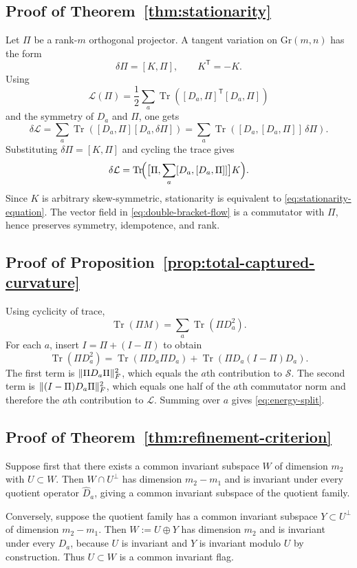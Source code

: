\documentclass[11pt,a4paper]{article}
\numberwithin{equation}{section}
\DeclareMathOperator{\Tr}{Tr}
\DeclarePairedDelimiter{\norm}{\lVert}{\rVert}
\newcommand{\Gr}{\mathrm{Gr}}
\theoremstyle{thmcompact}
\theoremstyle{remark}
\begin{document}
\subsection*{Proof of Theorem~\ref{thm:stationarity}}
Let $\Pi$ be a rank-$m$ orthogonal projector. A tangent variation on $\Gr(m,n)$ has the form
\[
\delta\Pi=[K,\Pi],\qquad K^{\mathsf T}=-K.
\]
Using
\[
\mathcal L(\Pi)=\frac12\sum_a\Tr([D_a,\Pi]^{\mathsf T}[D_a,\Pi])
\]
and the symmetry of $D_a$ and $\Pi$, one gets
\[
\delta\mathcal L=\sum_a\Tr([D_a,\Pi][D_a,\delta\Pi])=
\sum_a\Tr([D_a,[D_a,\Pi]]\,\delta\Pi).
\]
Substituting $\delta\Pi=[K,\Pi]$ and cycling the trace gives
\[
\delta\mathcal L=\Tr\!\Bigl(\bigl[\Pi,\sum_a[D_a,[D_a,\Pi]]\bigr]K\Bigr).
\]
Since $K$ is arbitrary skew-symmetric, stationarity is equivalent to \eqref{eq:stationarity-equation}. The vector field in \eqref{eq:double-bracket-flow} is a commutator with $\Pi$, hence preserves symmetry, idempotence, and rank.

\subsection*{Proof of Proposition~\ref{prop:total-captured-curvature}}
Using cyclicity of trace,
\[
\Tr(\Pi M)=\sum_a\Tr(\Pi D_a^2).
\]
For each $a$, insert $I=\Pi+(I-\Pi)$ to obtain
\[
\Tr(\Pi D_a^2)=\Tr(\Pi D_a\Pi D_a)+\Tr(\Pi D_a(I-\Pi)D_a).
\]
The first term is $\norm{\Pi D_a\Pi}_F^2$, which equals the $a$th contribution to $\mathcal S$. The second term is $\norm{(I-\Pi)D_a\Pi}_F^2$, which equals one half of the $a$th commutator norm and therefore the $a$th contribution to $\mathcal L$. Summing over $a$ gives \eqref{eq:energy-split}.

\subsection*{Proof of Theorem~\ref{thm:refinement-criterion}}
Suppose first that there exists a common invariant subspace $W$ of dimension $m_2$ with $U\subset W$. Then $W\cap U^{\perp}$ has dimension $m_2-m_1$ and is invariant under every quotient operator $\widehat D_a$, giving a common invariant subspace of the quotient family.

Conversely, suppose the quotient family has a common invariant subspace $Y\subset U^{\perp}$ of dimension $m_2-m_1$. Then $W:=U\oplus Y$ has dimension $m_2$ and is invariant under every $D_a$, because $U$ is invariant and $Y$ is invariant modulo $U$ by construction. Thus $U\subset W$ is a common invariant flag.
\end{document}
